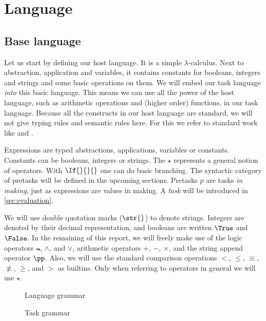 


\section{Language}



\subsection{Base language}

Let us start by defining our host language.
It is a simple $\lambda$-calculus.
Next to abstraction, application and variables,
it contains constants for booleans, integers and strings
and some basic operations on them.
We will embed our task language \emph{into} this basic language.
This means we can use all the power of the host language,
such as arithmetic operations and (higher order) functions,
in our task language.
Because all the constructs in our host language are standard,
we will not give typing rules and semantic rules here.
For this we refer to standard work like \textcite{books/Pierce02TAPL} and \textcite{books/Harper16PFPL}.

Expressions are typed abstractions, applications, variables or constants.
Constants can be booleans, integers or strings.
The $\star$ represents a general notion of operators.
With $\If{}{}{}$ one can do basic branching.
The syntactic category of pretasks will be defined in the upcoming sections.
Pretasks $p$ are tasks \emph{in making},
just as expressions are values in making.
A \emph{task} will be introduced in \autoref{sec:evaluation}.

We will use double quotation marks ($\str{}$) to denote strings.
Integers are denoted by their decimal representation,
and booleans are written $\True$ and $\False$.
In the remaining of this report,
we will freely make use of the logic operators $\Not$, $\land$, and $\lor$,
arithmetic operators $+$, $-$, $\times$,
and the string append operator $\pp$.
Also, we will use the standard comparison operations $<$, $\le$, $\equiv$, $\not\equiv$, $\ge$, and $>$
as builtins.
Only when referring to operators in general we will use $\star$.

\begin{figure}
  \small
  \caption{Language grammar} \label{fig:language-grammar}
\end{figure}

\begin{figure}
  \small
  \caption{Task grammar} \label{fig:task-grammar}
\end{figure}


